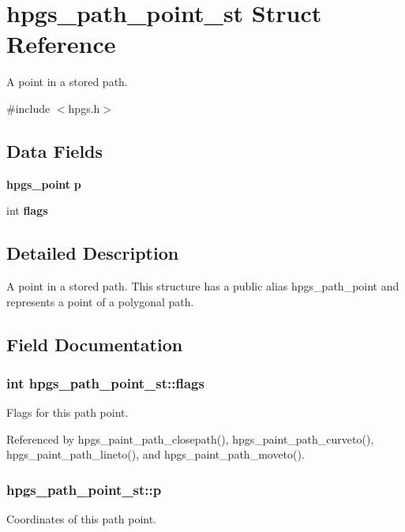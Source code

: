 \section{hpgs\_\-path\_\-point\_\-st Struct Reference}
\label{structhpgs__path__point__st}


A point in a stored path.  




{\ttfamily \#include $<$hpgs.h$>$}

\subsection*{Data Fields}
\begin{DoxyCompactItemize}
\item 
{\bf hpgs\_\-point} {\bf p}
\item 
int {\bf flags}
\end{DoxyCompactItemize}


\subsection{Detailed Description}
A point in a stored path. This structure has a public alias {\ttfamily hpgs\_\-path\_\-point} and represents a point of a polygonal path. 

\subsection{Field Documentation}
\subsubsection[{flags}]{\setlength{\rightskip}{0pt plus 5cm}int {\bf hpgs\_\-path\_\-point\_\-st::flags}}\label{structhpgs__path__point__st_a1a077ee4742f3a52cc403e82b997a1bc}
Flags for this path point. 

Referenced by hpgs\_\-paint\_\-path\_\-closepath(), hpgs\_\-paint\_\-path\_\-curveto(), hpgs\_\-paint\_\-path\_\-lineto(), and hpgs\_\-paint\_\-path\_\-moveto().

\subsubsection[{p}]{ {\bf hpgs\_\-path\_\-point\_\-st::p}}\label{structhpgs__path__point__st_ac89eeb90383204d79e177f60f99c5f5e}
Coordinates of this path point. 

